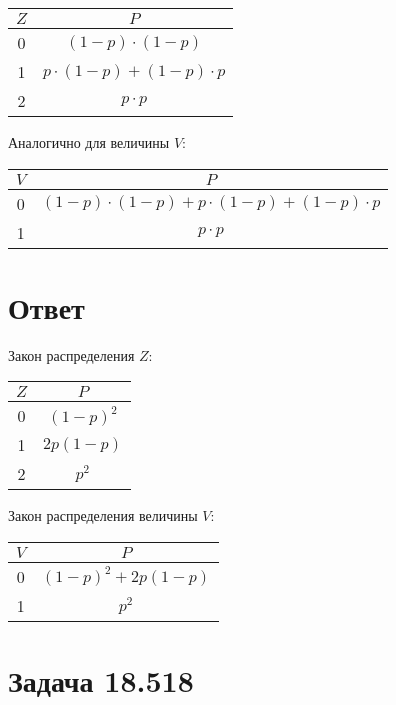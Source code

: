 \documentclass[a4paper,12pt]{article}
\begin{document}
    \begin{tabular}{|c|c|}
        \hline
        $Z$ & $P$                             \\
        \hline
        0   & $(1-p) \cdot (1-p)$             \\
        \hline
        1   & $p \cdot (1-p) + (1-p) \cdot p$ \\
        \hline
        2   & $p \cdot p$                     \\
        \hline
    \end{tabular}

    Аналогично для величины $V$:

    \begin{tabular}{|c|c|}
        \hline
        $V$ & $P$                                                 \\
        \hline
        0   & $(1-p) \cdot (1-p) + p \cdot (1-p) + (1-p) \cdot p$ \\
        \hline
        1   & $p \cdot p$                                         \\
        \hline
    \end{tabular}

    \section*{Ответ}
    Закон распределения $Z$:

    \begin{tabular}{|c|c|}
        \hline
        $Z$ & $P$         \\
        \hline
        0   & $(1-p)^2$   \\
        \hline
        1   & $2 p (1-p)$ \\
        \hline
        2   & $p^2$       \\
        \hline
    \end{tabular}

    Закон распределения величины $V$:

    \begin{tabular}{|c|c|}
        \hline
        $V$ & $P$                   \\
        \hline
        0   & $(1-p)^2 + 2 p (1-p)$ \\
        \hline
        1   & $p^2$                 \\
        \hline
    \end{tabular}


    \section{Задача 18.518}
\end{document}
